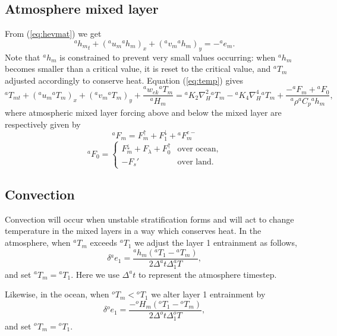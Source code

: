 \documentclass[11pt, a4paper,twoside]{article}
\newcommand{\dt}[2]{\Delta_{#2}^{#1}T}
\newcommand{\rhb}[1]{{{}^{#1}\rho}}
\newcommand{\cp}[1]{{{}^{#1}C_p}}
\newcommand{\uu}[2]{{{}^{#1}u_{#2}}}
\newcommand{\vv}[2]{{{}^{#1}v_{#2}}}
\newcommand{\ek}[1]{{{}^{#1}w_{ek}}}
\newcommand{\HH}[2]{{{}^{#1}H_{#2}}}
\newcommand{\kh}[1]{{{}^{#1}K_2}}
\newcommand{\kf}[1]{{{}^{#1}K_4}}
\newcommand{\e}[2]{{{}^{#1}e_{#2}}}
\newcommand{\h}[2]{{{}^{#1}h_{#2}}}
\newcommand{\T}[2]{{{}^{#1}T_{#2}}}
\newcommand{\F}[3]{{{}^{#1}F^{#3}_{#2}}}
\newcommand{\Fup}[1]{{F^{\uparrow}_{#1}}}
\newcommand{\Fdown}[1]{{F^{\downarrow}_{#1}}}
\numberwithin{equation}{section}
\begin{document}
\subsection{Atmosphere mixed layer}
From (\ref{eq:hevmat})  we get
\begin{equation}\label{eq:hevmata}
\h{a}{m}_t + (\uu{a}{m}\h{a}{m})_x + (\vv{a}{m} \h{a}{m})_y =   -\e{a}{m}.
\end{equation}
Note that $\h{a}{m}$ is constrained to prevent very small values occurring: when $\h{a}{m}$ becomes smaller than a critical value, it is reset to the critical value, and $\T{a}{m}$ adjusted accordingly to conserve heat.
Equation (\ref{eq:temp}) gives
\begin{equation}\label{eq:tempca}
\T{a}{mt} + (\uu{a}{m} \T{a}{m})_x + (\vv{a}{m} \T{a}{m})_y + \frac{\ek{a} \T{a}{m}}{\HH{a}{m}}  =  \kh{a} \nabla_H^2 \T{a}{m} - \kf{a}\nabla_H^4\T{a}{m} +\frac{-\F{a}{m}{} + \F{a}{0}{}}{\rhb{a} \cp{a} \h{a}{m}},
\end{equation}
where atmospheric  mixed layer forcing above and below the mixed layer are respectively given by
\begin{equation}\F{a}{m}{} = \Fup{m} + \Fdown{1} + \F{a}{m}{e-}\end{equation}
\begin{equation}\F{a}{0}{} = \begin{cases} \Fdown{m} + F_{\lambda} + \Fup{0} & \text{over ocean,}\\
-F_s' & \text{over land.}
\end{cases}\end{equation}

\subsection{Convection}
Convection will occur when unstable stratification forms and will act to change temperature in the mixed layers in a way which conserves heat.
In the atmosphere, when $\T{a}{m}$ exceeds $\T{a}{1}$ we adjust the layer 1 entrainment as follows,
\begin{equation}\label{eq:atconv}
 \delta \e{a}{1}= \frac{\h{a}{m}(\T{a}{1} - \T{a}{m} )}{2 \Delta^at \dt{a}{1} },
\end{equation}
and set $\T{a}{m} = \T{a}{1}$.
Here we use $\Delta^at$ to represent the atmosphere timestep.

Likewise, in the ocean, when $\T{o}{m} < \T{o}{1}$ we alter layer 1 entrainment by
\begin{equation}\label{eq:occonv}
\delta \e{o}{1}= \frac{ - \HH{o}{m}(\T{o}{1} - \T{o}{m} )}{2 \Delta^ot \dt{o}{1}},
\end{equation}
and set  $\T{o}{m} = \T{o}{1}$.
\end{document}
